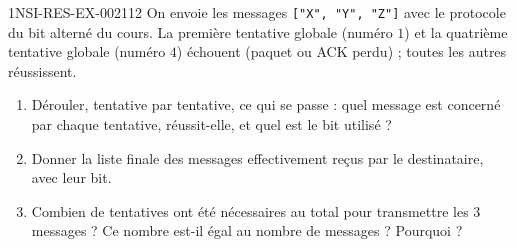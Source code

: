 \begin{exercice}{1NSI-RES-EX-002}{1}{12}
On envoie les messages \lstinline{["X", "Y", "Z"]} avec le protocole du bit alterné du
cours. La première tentative globale (numéro $1$) et la quatrième tentative globale
(numéro $4$) échouent (paquet ou ACK perdu) ; toutes les autres réussissent.
\begin{enumerate}
  \item Dérouler, tentative par tentative, ce qui se passe : quel message est concerné par chaque tentative, réussit-elle, et quel est le bit utilisé ?
  \item Donner la liste finale des messages effectivement reçus par le destinataire, avec leur bit.
  \item Combien de tentatives ont été nécessaires au total pour transmettre les $3$ messages ? Ce nombre est-il égal au nombre de messages ? Pourquoi ?
\end{enumerate}
\end{exercice}
